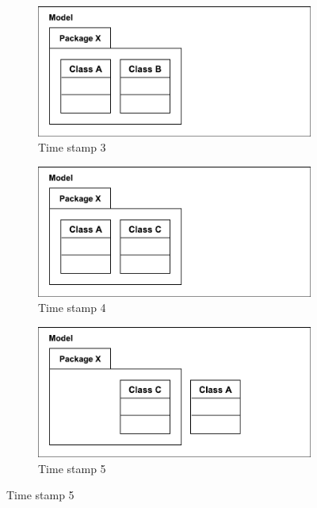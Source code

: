 \documentclass{llncs}
\begin{document}
\begin{figure}[ht]
\begin{subfigure}[t]{0.329\linewidth}
        \includegraphics[width=\linewidth]{images/illustration_5}
        \caption{Time stamp 3}
        \label{fig:illustration_5}
    \end{subfigure}
    \hfill
    \begin{subfigure}[t]{0.329\linewidth}
        \centering
        \includegraphics[width=\linewidth]{images/illustration_6}
        \caption{Time stamp 4}
        \label{fig:illustration_6}
    \end{subfigure}
    \begin{subfigure}[t]{0.329\linewidth}
        \centering
        \includegraphics[width=\linewidth]{images/illustration_7}
        \caption{Time stamp 5}
        \label{fig:illustration_7}
    \end{subfigure}

\end{figure}
\end{document}
